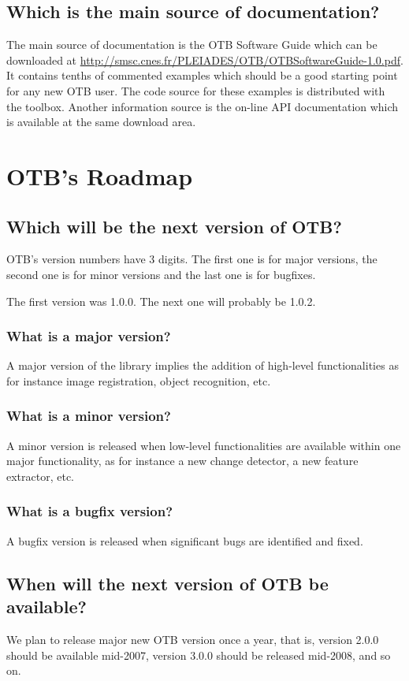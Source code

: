 \subsection{Which is the main source of documentation?}
The main source of documentation is the OTB Software Guide which can
be downloaded at
\url{http://smsc.cnes.fr/PLEIADES/OTB/OTBSoftwareGuide-1.0.pdf}. It
contains tenths of commented examples which should be a good starting
point for any new OTB user. The code source for these examples is
distributed with the toolbox. Another information source is the
on-line API documentation which is available at the same download
area.


\section{OTB's Roadmap}
\subsection{Which will be the next version of OTB?}
OTB's version numbers have 3 digits. The first one is for major
versions, the second one is for minor versions and the last one is for
bugfixes.

The first version was 1.0.0. The next one will probably be 1.0.2.

\subsubsection{What is a major version?}
A major version of the library implies the addition of high-level
functionalities as for instance image registration, object recognition, etc.

\subsubsection{What is a minor version?}
A minor version is released when low-level functionalities are
available within one major functionality, as for instance a new
change detector, a new feature extractor, etc.

\subsubsection{What is a bugfix version?}
A bugfix version is released when significant bugs are identified and fixed.

\subsection{When will the next version of OTB be available?}
We plan to release major new OTB version once a year, that is, version
2.0.0 should be available mid-2007, version 3.0.0 should be released
mid-2008, and so on.

